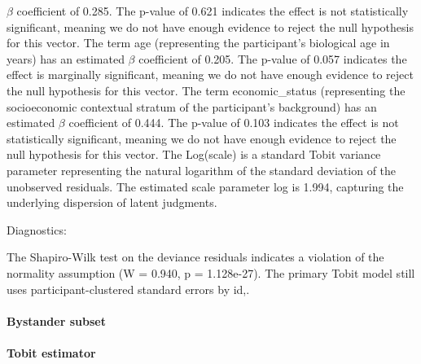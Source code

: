 \documentclass[11pt]{article}
\begin{document}
$\beta$ coefficient of 0.285. The p-value of 0.621 indicates the effect is not statistically significant, meaning we do not have enough evidence to reject the null hypothesis for this vector. The term age (representing the participant's biological age in years) has an estimated $\beta$ coefficient of 0.205. The p-value of 0.057 indicates the effect is marginally significant, meaning we do not have enough evidence to reject the null hypothesis for this vector. The term economic\_status (representing the socioeconomic contextual stratum of the participant's background) has an estimated $\beta$ coefficient of 0.444. The p-value of 0.103 indicates the effect is not statistically significant, meaning we do not have enough evidence to reject the null hypothesis for this vector. The Log(scale) is a standard Tobit variance parameter representing the natural logarithm of the standard deviation of the unobserved residuals. The estimated scale parameter log is 1.994, capturing the underlying dispersion of latent judgments.

Diagnostics:

The Shapiro-Wilk test on the deviance residuals indicates a violation of the normality assumption (W = 0.940, p = 1.128e-27). The primary Tobit model still uses participant-clustered standard errors by id,.


\paragraph{Bystander subset}

\paragraph{Tobit estimator}
\end{document}

